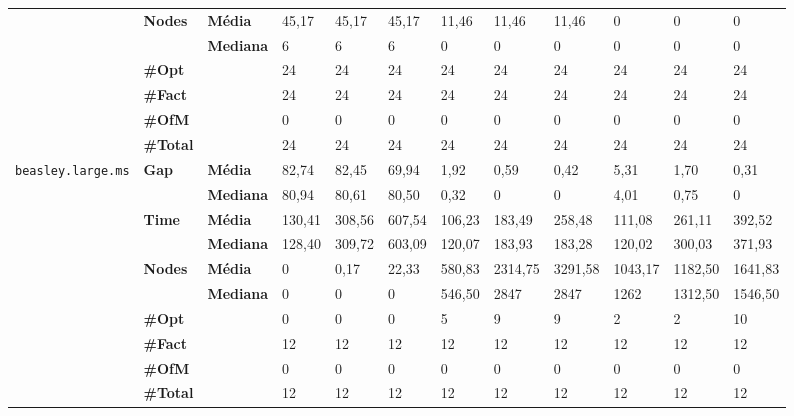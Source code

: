 \documentclass[]{article}
\begin{document}
\begin{table}[]
\begin{adjustbox}{angle=90}
\begin{tabular}{cll|lll|lll|lll}
				\cline{2-12}
				& \multirow{2}{*}{\textbf{Nodes}} & \textbf{Média} & 45,17 & 45,17 & 45,17 & 11,46 & 11,46 & 11,46 & 0 & 0 & 0 \\
				& & \textbf{Mediana} & 6 & 6 & 6 & 0 & 0 & 0 & 0 & 0 & 0 \\
				\cline{2-12}
				& \textbf{\#Opt} & & 24 & 24 & 24 & 24 & 24 & 24 & 24 & 24 & 24 \\
				& \textbf{\#Fact} & & 24 & 24 & 24 & 24 & 24 & 24 & 24 & 24 & 24 \\
				& \textbf{\#OfM} & & 0 & 0 & 0 & 0 & 0 & 0 & 0 & 0 & 0 \\
				& \textbf{\#Total} & & 24 & 24 & 24 & 24 & 24 & 24 & 24 & 24 & 24 \\
				\hline
				\multirow{7}{*}{\texttt{beasley.large.ms}} & \multirow{2}{*}{\textbf{Gap}} & \textbf{Média} & 82,74 & 82,45 & 69,94 & 1,92 & 0,59 & 0,42 & 5,31 & 1,70 & 0,31 \\
				& & \textbf{Mediana} & 80,94 & 80,61 & 80,50 & 0,32 & 0 & 0 & 4,01 & 0,75 & 0 \\
				\cline{2-12}
				& \multirow{2}{*}{\textbf{Time}} & \textbf{Média} & 130,41 & 308,56 & 607,54 & 106,23 & 183,49 & 258,48 & 111,08 & 261,11 & 392,52 \\
				& & \textbf{Mediana} & 128,40 & 309,72 & 603,09 & 120,07 & 183,93 & 183,28 & 120,02 & 300,03 & 371,93 \\
				\cline{2-12}
				& \multirow{2}{*}{\textbf{Nodes}} & \textbf{Média} & 0 & 0,17 & 22,33 & 580,83 & 2314,75 & 3291,58 & 1043,17 & 1182,50 & 1641,83 \\
				& & \textbf{Mediana} & 0 & 0 & 0 & 546,50 & 2847 & 2847 & 1262 & 1312,50 & 1546,50 \\
				\cline{2-12}
				& \textbf{\#Opt} & & 0 & 0 & 0 & 5 & 9 & 9 & 2 & 2 & 10 \\
				& \textbf{\#Fact} & & 12 & 12 & 12 & 12 & 12 & 12 & 12 & 12 & 12 \\
				& \textbf{\#OfM} & & 0 & 0 & 0 & 0 & 0 & 0 & 0 & 0 & 0 \\
				& \textbf{\#Total} & & 12 & 12 & 12 & 12 & 12 & 12 & 12 & 12 & 12 \\
			\end{tabular}
		\end{adjustbox}
	\end{table}
	
\end{document}
